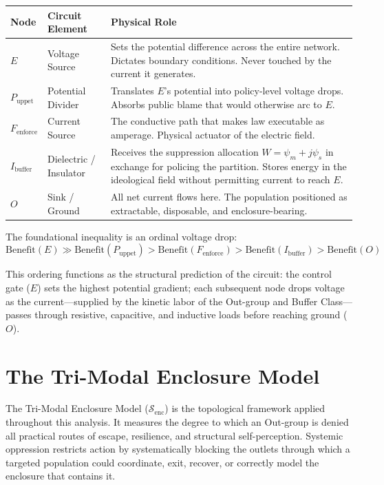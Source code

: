 \begin{center}
\begin{tabular}{>{\raggedright}p{2.5cm} >{\raggedright}p{3.5cm} >{\raggedright\arraybackslash}p{7cm}}
\toprule
\textbf{Node} & \textbf{Circuit Element} & \textbf{Physical Role} \\
\midrule
$E$ & Voltage Source & Sets the potential difference across the entire network. Dictates boundary conditions. Never touched by the current it generates. \\
$P_{\text{uppet}}$ & Potential Divider & Translates $E$'s potential into policy-level voltage drops. Absorbs public blame that would otherwise arc to $E$. \\
$F_{\text{enforce}}$ & Current Source & The conductive path that makes law executable as amperage. Physical actuator of the electric field. \\
$I_{\text{buffer}}$ & Dielectric / Insulator & Receives the suppression allocation $W = \psi_m + j\psi_s$ in exchange for policing the partition. Stores energy in the ideological field without permitting current to reach $E$. \\
$O$ & Sink / Ground & All net current flows here. The population positioned as extractable, disposable, and enclosure-bearing. \\
\bottomrule
\end{tabular}
\end{center}

The foundational inequality is an ordinal voltage drop:
\begin{equation}\label{eq:0.2-tier-voltage-drop}
\text{Benefit}(E) \gg \text{Benefit}(P_{\text{uppet}}) > \text{Benefit}(F_{\text{enforce}}) > \text{Benefit}(I_{\text{buffer}}) > \text{Benefit}(O)
\end{equation}

This ordering functions as the structural prediction of the
circuit: the control gate ($E$) sets the highest potential gradient; each
subsequent node drops voltage as the current---supplied by the kinetic labor of
the Out-group and Buffer Class---passes through resistive, capacitive, and
inductive loads before reaching ground ($O$).

\section{The Tri-Modal Enclosure Model}
\label{sec:trimodal}

The Tri-Modal Enclosure Model ($\mathcal{S}_{\text{enc}}$) is the topological
framework applied throughout this analysis. It measures the degree to which an
Out-group is denied all practical routes of escape, resilience, and structural
self-perception. Systemic oppression restricts action by
systematically blocking the outlets through which a targeted population could
coordinate, exit, recover, or correctly model the enclosure that contains it.

